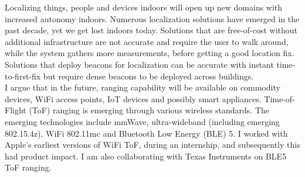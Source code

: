 \documentclass[10pt]{article}
\begin{document}
Localizing things, people and devices indoors will open up new domains with increased autonomy indoors. 
Numerous localization solutions have emerged in the past decade, yet we get lost indoors today. 
Solutions that are free-of-cost without additional infrastructure are not accurate and require the user to walk around, while the system gathers more measurements, before getting a good location fix. %
Solutions that deploy beacons for localization can be accurate with instant time-to-first-fix but require dense beacons to be deployed across buildings.\\

I argue that in the future, ranging capability will be available on commodity devices, WiFi access points, IoT devices and possibly smart appliances. 
Time-of-Flight (ToF) ranging is emerging through various wireless standards. The emerging technologies include mmWave, ultra-wideband (including emerging 802.15.4z), WiFi 802.11mc and Bluetooth Low Energy (BLE) 5.  I worked with Apple's earliest versions of WiFi ToF, during an internship, and subsequently this had product impact. I am also collaborating with Texas Instruments on BLE5 ToF ranging. \\
\end{document}
